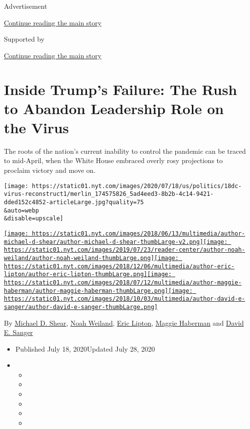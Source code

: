 Advertisement

\protect\hyperlink{after-top}{Continue reading the main story}

Supported by

\protect\hyperlink{after-sponsor}{Continue reading the main story}

\hypertarget{inside-trumps-failure-the-rush-to-abandon-leadership-role-on-the-virus}{%
\section{Inside Trump's Failure: The Rush to Abandon Leadership Role on
the
Virus}\label{inside-trumps-failure-the-rush-to-abandon-leadership-role-on-the-virus}}

The roots of the nation's current inability to control the pandemic can
be traced to mid-April, when the White House embraced overly rosy
projections to proclaim victory and move on.

\texttt{[image: https://static01.nyt.com/images/2020/07/18/us/politics/18dc-virus-reconstruct1/merlin\_174575826\_5ad4eed3-8b2b-4c14-9421-dded152c4852-articleLarge.jpg?quality=75\\\&auto=webp\\\&disable=upscale]}

\href{https://www.nytimes.com/by/michael-d-shear}{\texttt{[image: https://static01.nyt.com/images/2018/06/13/multimedia/author-michael-d-shear/author-michael-d-shear-thumbLarge-v2.png]}}\href{https://www.nytimes.com/by/noah-weiland}{\texttt{[image: https://static01.nyt.com/images/2019/07/23/reader-center/author-noah-weiland/author-noah-weiland-thumbLarge.png]}}\href{https://www.nytimes.com/by/eric-lipton}{\texttt{[image: https://static01.nyt.com/images/2018/12/06/multimedia/author-eric-lipton/author-eric-lipton-thumbLarge.png]}}\href{https://www.nytimes.com/by/maggie-haberman}{\texttt{[image: https://static01.nyt.com/images/2018/07/12/multimedia/author-maggie-haberman/author-maggie-haberman-thumbLarge.png]}}\href{https://www.nytimes.com/by/david-e-sanger}{\texttt{[image: https://static01.nyt.com/images/2018/10/03/multimedia/author-david-e-sanger/author-david-e-sanger-thumbLarge.png]}}

By \href{https://www.nytimes.com/by/michael-d-shear}{Michael D. Shear},
\href{https://www.nytimes.com/by/noah-weiland}{Noah Weiland},
\href{https://www.nytimes.com/by/eric-lipton}{Eric Lipton},
\href{https://www.nytimes.com/by/maggie-haberman}{Maggie Haberman} and
\href{https://www.nytimes.com/by/david-e-sanger}{David E. Sanger}

\begin{itemize}
\item
  Published July 18, 2020Updated July 28, 2020
\item
  \begin{itemize}
  \item
  \item
  \item
  \item
  \item
  \item
  \end{itemize}
\end{itemize}

